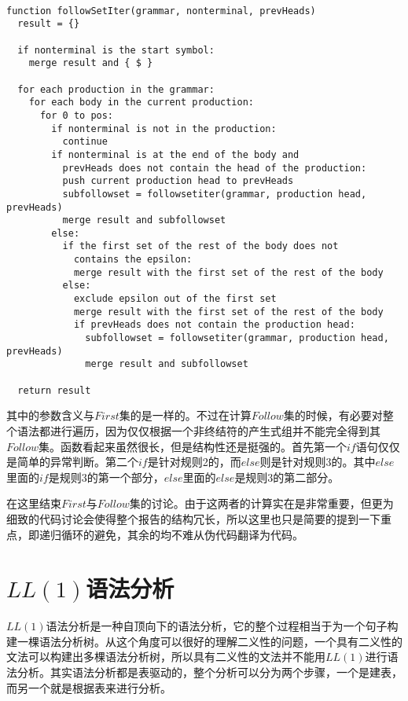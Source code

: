 \begin{verbatim}

function followSetIter(grammar, nonterminal, prevHeads)
  result = {}

  if nonterminal is the start symbol:
    merge result and { $ }

  for each production in the grammar:
    for each body in the current production:
      for 0 to pos:
        if nonterminal is not in the production:
          continue
        if nonterminal is at the end of the body and
          prevHeads does not contain the head of the production:
          push current production head to prevHeads
          subfollowset = followsetiter(grammar, production head, prevHeads)
          merge result and subfollowset
        else:
          if the first set of the rest of the body does not
            contains the epsilon:
            merge result with the first set of the rest of the body
          else:
            exclude epsilon out of the first set
            merge result with the first set of the rest of the body
            if prevHeads does not contain the production head:
              subfollowset = followsetiter(grammar, production head, prevHeads)
              merge result and subfollowset
              
  return result

\end{verbatim}

其中的参数含义与$First$集的是一样的。不过在计算$Follow$集的时候，有必要对整个语法都进行遍历，因为仅仅根据一个非终结符的产生式组并不能完全得到其$Follow$集。函数看起来虽然很长，但是结构性还是挺强的。首先第一个$if$语句仅仅是简单的异常判断。第二个$if$是针对规则2的，而$else$则是针对规则3的。其中$else$里面的$if$是规则3的第一个部分，$else$里面的$else$是规则3的第二部分。

在这里结束$First$与$Follow$集的讨论。由于这两者的计算实在是非常重要，但更为细致的代码讨论会使得整个报告的结构冗长，所以这里也只是简要的提到一下重点，即递归循环的避免，其余的均不难从伪代码翻译为代码。

\section{$LL(1)$语法分析}

$LL(1)$语法分析是一种自顶向下的语法分析，它的整个过程相当于为一个句子构建一棵语法分析树。从这个角度可以很好的理解二义性的问题，一个具有二义性的文法可以构建出多棵语法分析树，所以具有二义性的文法并不能用$LL(1)$进行语法分析。其实语法分析都是表驱动的，整个分析可以分为两个步骤，一个是建表，而另一个就是根据表来进行分析。

